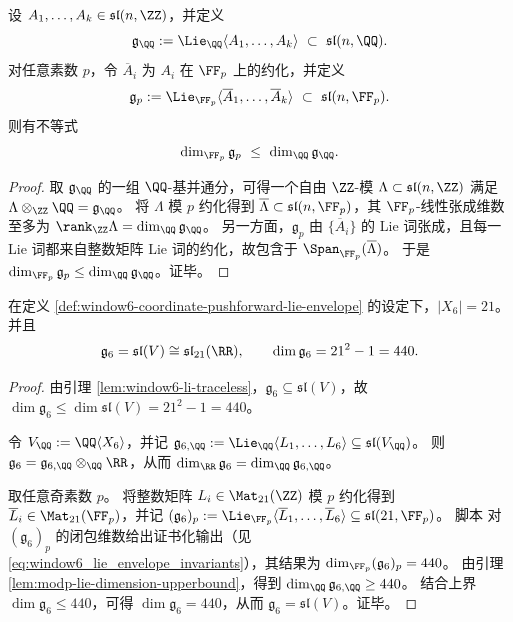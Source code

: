 \begin{lemma}[模素数维数证书的特征 \(0\) 提升]\label{lem:modp-lie-dimension-upperbound}
设 \(A_1,\dots,A_k\in\mathfrak{sl}(n,\ZZ)\)，并定义
\[
\mathfrak{g}_{\QQ}:=\Lie_{\QQ}\langle A_1,\dots,A_k\rangle\ \subset\ \mathfrak{sl}(n,\QQ).
\]
对任意素数 \(p\)，令 \(\overline{A}_i\) 为 \(A_i\) 在 \(\FF_p\) 上的约化，并定义
\[
\mathfrak{g}_{p}:=\Lie_{\FF_p}\langle \overline{A}_1,\dots,\overline{A}_k\rangle\ \subset\ \mathfrak{sl}(n,\FF_p).
\]
则有不等式
\[
\dim_{\FF_p}\mathfrak{g}_{p}\ \le\ \dim_{\QQ}\mathfrak{g}_{\QQ}.
\]
\end{lemma}
\begin{proof}
取 \(\mathfrak{g}_{\QQ}\) 的一组 \(\QQ\)-基并通分，可得一个自由 \(\ZZ\)-模 \(\Lambda\subset \mathfrak{sl}(n,\ZZ)\) 满足 \(\Lambda\otimes_{\ZZ}\QQ=\mathfrak{g}_{\QQ}\)。
将 \(\Lambda\) 模 \(p\) 约化得到 \(\overline{\Lambda}\subset\mathfrak{sl}(n,\FF_p)\)，其 \(\FF_p\)-线性张成维数至多为 \(\rank_{\ZZ}\Lambda=\dim_{\QQ}\mathfrak{g}_{\QQ}\)。
另一方面，\(\mathfrak{g}_{p}\) 由 \(\{\overline{A}_i\}\) 的 Lie 词张成，且每一 Lie 词都来自整数矩阵 Lie 词的约化，故包含于 \(\Span_{\FF_p}(\overline{\Lambda})\)。
于是 \(\dim_{\FF_p}\mathfrak{g}_{p}\le \dim_{\QQ}\mathfrak{g}_{\QQ}\)。证毕。
\end{proof}

\begin{theorem}\label{thm:window6-lie-envelope-sl21}
在定义 \ref{def:window6-coordinate-pushforward-lie-envelope} 的设定下，\(|X_6|=21\)。
并且
\[
\mathfrak{g}_6=\mathfrak{sl}(V)\cong \mathfrak{sl}_{21}(\RR),
\qquad
\dim \mathfrak{g}_6=21^2-1=440.
\]
\end{theorem}
\begin{proof}
由引理 \ref{lem:window6-li-traceless}，\(\mathfrak{g}_6\subseteq\mathfrak{sl}(V)\)，故 \(\dim\mathfrak{g}_6\le \dim\mathfrak{sl}(V)=21^2-1=440\)。\par
令 \(V_{\QQ}:=\QQ\langle X_6\rangle\)，并记 \(\mathfrak{g}_{6,\QQ}:=\Lie_{\QQ}\langle L_1,\dots,L_6\rangle\subseteq \mathfrak{sl}(V_{\QQ})\)。
则 \(\mathfrak{g}_6=\mathfrak{g}_{6,\QQ}\otimes_{\QQ}\RR\)，从而 \(\dim_{\RR}\mathfrak{g}_6=\dim_{\QQ}\mathfrak{g}_{6,\QQ}\)。\par
取任意奇素数 \(p\)。
将整数矩阵 \(L_i\in \Mat_{21}(\ZZ)\) 模 \(p\) 约化得到 \(\overline{L}_i\in \Mat_{21}(\FF_p)\)，并记
\(
(\mathfrak{g}_6)_p:=\Lie_{\FF_p}\langle \overline{L}_1,\dots,\overline{L}_6\rangle\subseteq \mathfrak{sl}(21,\FF_p)
\)。
脚本 \texttt{} 对 \((\mathfrak{g}_6)_p\) 的闭包维数给出证书化输出（见 \eqref{eq:window6_lie_envelope_invariants}），其结果为
\(
\dim_{\FF_p}(\mathfrak{g}_6)_p=440
\)。
由引理 \ref{lem:modp-lie-dimension-upperbound}，得到 \(\dim_{\QQ}\mathfrak{g}_{6,\QQ}\ge 440\)。
结合上界 \(\dim\mathfrak{g}_6\le 440\)，可得 \(\dim\mathfrak{g}_6=440\)，从而 \(\mathfrak{g}_6=\mathfrak{sl}(V)\)。证毕。
\end{proof}

